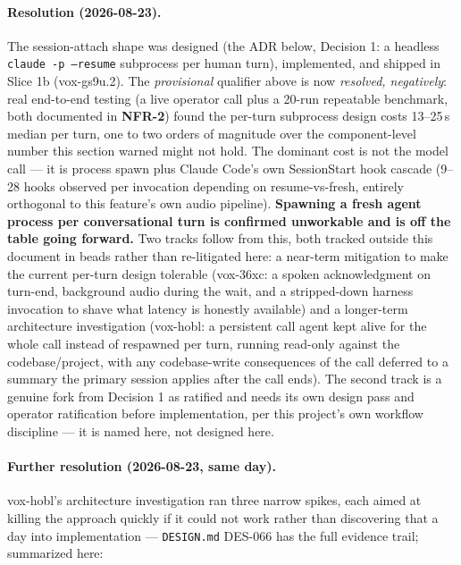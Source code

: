 \documentclass[a4paper,11pt]{report}
\newcommand{\nfr}[1]{\textbf{NFR-#1}}
\begin{document}
\paragraph{Resolution (2026-08-23).} The session-attach shape was
designed (the ADR below, Decision 1: a headless \texttt{claude -p
--resume} subprocess per human turn), implemented, and shipped in Slice
1b (vox-gs9u.2). The \emph{provisional} qualifier above is now
\emph{resolved, negatively}: real end-to-end testing (a live operator call
plus a 20-run repeatable benchmark, both documented in \nfr{2}) found the
per-turn subprocess design costs 13--25\,s median per turn, one to two
orders of magnitude over the component-level number this section warned
might not hold. The dominant cost is not the model call --- it is process
spawn plus Claude Code's own SessionStart hook cascade (9--28 hooks
observed per invocation depending on resume-vs-fresh, entirely orthogonal
to this feature's own audio pipeline). \textbf{Spawning a fresh agent
process per conversational turn is confirmed unworkable and is off the
table going forward.} Two tracks follow from this, both tracked outside
this document in beads rather than re-litigated here: a near-term
mitigation to make the current per-turn design tolerable (vox-36xc: a
spoken acknowledgment on turn-end, background audio during the wait, and
a stripped-down harness invocation to shave what latency is honestly
available) and a longer-term architecture investigation (vox-hobl: a
persistent call agent kept alive for the whole call instead of respawned
per turn, running read-only against the codebase/project, with any
codebase-write consequences of the call deferred to a summary the primary
session applies after the call ends). The second track is a genuine fork
from Decision 1 as ratified and needs its own design pass and operator
ratification before implementation, per this project's own workflow
discipline --- it is named here, not designed here.

\paragraph{Further resolution (2026-08-23, same day).} vox-hobl's
architecture investigation ran three narrow spikes, each aimed at killing
the approach quickly if it could not work rather than discovering that a
day into implementation --- \texttt{DESIGN.md} DES-066 has the full
evidence trail; summarized here:
\end{document}

